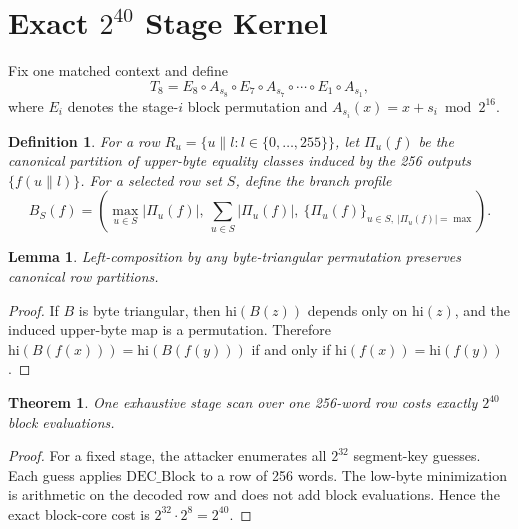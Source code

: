 \documentclass[11pt]{article}
\newtheorem{theorem}{Theorem}
\newtheorem{lemma}{Lemma}
\newtheorem{definition}{Definition}
\providecommand{\StageKernelBound}{2^{40}}
\begin{document}
\section{Exact $2^{40}$ Stage Kernel}
Fix one matched context and define
\[
T_8 = E_8\circ A_{s_8}\circ E_7\circ A_{s_7}\circ \cdots \circ E_1\circ A_{s_1},
\]
where \(E_i\) denotes the stage-\(i\) block permutation and \(A_{s_i}(x)=x+s_i \bmod 2^{16}\).

\begin{definition}
For a row \(R_u=\{u\|l : l\in\{0,\dots,255\}\}\), let \(\Pi_u(f)\) be the canonical partition of upper-byte equality classes induced by the 256 outputs \(\{f(u\|l)\}\). For a selected row set \(S\), define the branch profile
\[
B_S(f)=\left(\max_{u\in S} |\Pi_u(f)|,\ \sum_{u\in S} |\Pi_u(f)|,\ \{\Pi_u(f)\}_{u\in S,\ |\Pi_u(f)|=\max}\right).
\]
\end{definition}

\begin{lemma}
Left-composition by any byte-triangular permutation preserves canonical row partitions.
\end{lemma}

\begin{proof}
If \(B\) is byte triangular, then \(\mathrm{hi}(B(z))\) depends only on \(\mathrm{hi}(z)\), and the induced upper-byte map is a permutation. Therefore \(\mathrm{hi}(B(f(x)))=\mathrm{hi}(B(f(y)))\) if and only if \(\mathrm{hi}(f(x))=\mathrm{hi}(f(y))\).
\end{proof}

\begin{theorem}
One exhaustive stage scan over one 256-word row costs exactly \(\StageKernelBound\) block evaluations.
\end{theorem}

\begin{proof}
For a fixed stage, the attacker enumerates all \(2^{32}\) segment-key guesses. Each guess applies \(\mathrm{DEC\_Block}\) to a row of 256 words. The low-byte minimization is arithmetic on the decoded row and does not add block evaluations. Hence the exact block-core cost is \(2^{32}\cdot 2^8=2^{40}\).
\end{proof}
\end{document}
